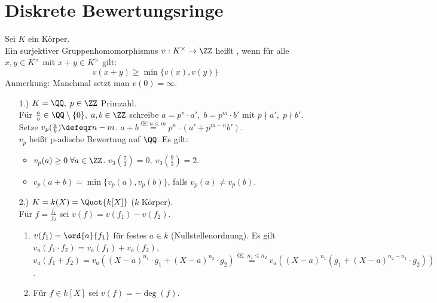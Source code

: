 \section{Diskrete Bewertungsringe}

\begin{Def} 
Sei $K$ ein Körper.\\
Ein surjektiver Gruppenhomomorphismus $v: K^{\times} \to \ZZ$ heißt
, wenn für alle $x,y \in
K^{\times}$ mit $x + y \in K^{\times}$ gilt:
$$ v(x+y) \geq \min\{v(x),v(y)\}$$
Anmerkung: Manchmal setzt man $v(0) = \infty$.
\end{Def}

\begin{nnBsp} 
\begin{enumerate}
  \item[1.)] $K = \QQ, \; p \in \ZZ$ Primzahl.\\
  Für $\frac{a}{b} \in \QQ \setminus \{0\}, \; a,b \in \ZZ$
  schreibe $a = p^n \cdot a', \; b = p^m \cdot b'$ mit $p \nmid a',\; p \nmid
  b'$.\\
  Setze $v_p(\frac{a}{b}) \defeqr n - m$.
  $a + b \overset{\text{\OE}: n \leq m}{=} p^n \cdot (a' + p^{m-n} b')$.\\
  $v_p$ heißt p-adische Bewertung auf $\QQ$. Es gilt:
  \begin{itemize}
    \item $v_p(a) \geq 0 \; \forall a \in \ZZ$. $v_3(\frac{7}{2}) = 0, \ 
    v_3(\frac{9}{2})= 2$.
    \item $v_p(a+b) = \min\{v_p(a),v_p(b)\}$, falls $v_p(a) \not= v_p(b)$.
  \end{itemize}
  \item[2.)] $K = k(X) = \Quot{k[X]}$ ($k$ Körper).\\
  Für $f = \frac{f_1}{f_2}$ sei $v(f) = v(f_1) - v(f_2)$.
  \begin{enumerate}
    \item $v(f_1) = \ord{a}{f_1}$ für festes $a \in k$
    (Nullstellenordnung).
    Es gilt $v_a(f_1 \cdot f_2) = v_a(f_1) + v_a(f_2)$, 
    $v_a(f_1 + f_2) = v_a((X-a)^{n_1} \cdot g_1 + (X-a)^{n_2} \cdot g_2)
    \overset{\text{\OE}: \; n_1 \leq n_2}{=} v_a((X-a)^{n_1}(g_1 + (X-a)^{n_2 - 
    n_1} \cdot g_2))$.
    \item Für $f \in k[X]$ sei $v(f) = - \deg (f)$.
  \end{enumerate}
\end{enumerate}
\end{nnBsp}

